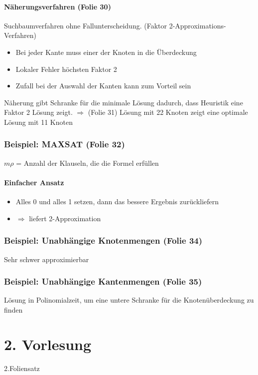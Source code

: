 \documentclass[ngerman]{scrartcl}
\begin{document}
\paragraph*{Näherungsverfahren (Folie 30)}
Suchbaumverfahren ohne Fallunterscheidung. (Faktor 2-Approximations-Verfahren)
\begin{itemize}
  \item Bei jeder Kante muss einer der Knoten in die Überdeckung 
  \item Lokaler Fehler höchsten Faktor 2
  \item Zufall bei der Auswahl der Kanten kann zum Vorteil sein
\end{itemize} 

Näherung gibt Schranke für die minimale Lösung dadurch, dass Heuristik eine Faktor 2 Lösung zeigt.
$\Rightarrow$ (Folie 31) Lösung mit 22 Knoten zeigt eine optimale Lösung mit 11 Knoten

\subsubsection{Beispiel: MAXSAT (Folie 32)}
$ m\rho $ = Anzahl der Klauseln, die die Formel erfüllen
\paragraph*{Einfacher Ansatz}
\begin{itemize}
  \item Alles 0 und alles 1 setzen, dann das bessere Ergebnis zurückliefern
  \item $\Rightarrow$ liefert 2-Approximation
\end{itemize}

\subsubsection{Beispiel: Unabhängige Knotenmengen (Folie 34)}
Sehr schwer approximierbar

\subsubsection{Beispiel: Unabhängige Kantenmengen (Folie 35)}
Lösung in Polinomialzeit, um eine untere Schranke für die Knotenüberdeckung zu finden


\section{2. Vorlesung}
2.Foliensatz
\end{document}
